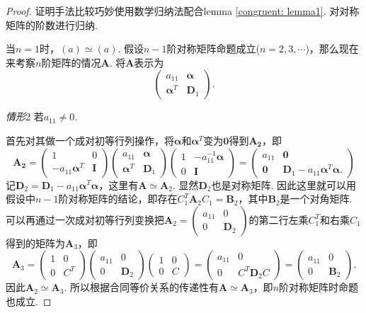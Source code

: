 \documentclass{article}
\newcommand{\mbf}[1]{\bm{#1}}
\begin{document}
\begin{proof}
\rm 证明手法比较巧妙使用数学归纳法配合lemma \ref{congruent: lemma1}. 对对称矩阵的阶数进行归纳.

当$n=1$时，$(a) \simeq (a)$.
假设$n-1$阶对称矩阵命题成立($n=2,3,\cdots$)，那么现在来考察$n$阶矩阵的情况$\mbf{A}$. 将$\mbf{A}$表示为
$$
\begin{pmatrix}
a_{11} & \mbf{\alpha}\\
\mbf{\alpha}^T & \mbf{D}_1
\end{pmatrix}.
$$

\emph{情形}2 若$a_{11} \neq 0$.

首先对其做一个成对初等行列操作，将$\mbf{\alpha}$和$\mbf{\alpha}^T$变为$\mbf{0}$得到$\mbf{A_2}$，即
$$
\mbf{A_2} =
\begin{pmatrix}
1 & 0 \\
-a_{11}\mbf{\alpha}^T & \mbf{I}
\end{pmatrix}
\begin{pmatrix}
a_{11} & \mbf{\alpha}\\
\mbf{\alpha}^T & \mbf{D}_1
\end{pmatrix} 
\begin{pmatrix}
1 & -a_{11}^{-1}\mbf{\alpha} \\
0 & \mbf{I}
\end{pmatrix}
= \begin{pmatrix}
a_{11}  & \mbf{0} \\
\mbf{0} & \mbf{D}_1-a_{11}\mbf{\alpha}^T\mbf{\alpha}.
\end{pmatrix}
$$
记$\mbf{D}_2 =  \mbf{D}_1-a_{11}\mbf{\alpha}^T\mbf{\alpha}$，这里有$\mbf{A} \simeq \mbf{A}_2$. 显然$\mbf{D}_2$也是对称矩阵. 因此这里就可以用假设中$n-1$阶对称矩阵的结论，即存在$C_1^T\mbf{A}_2C_1 = \mbf{B}_2$，其中$\mbf{B}_2$是一个对角矩阵. 可以再通过一次成对初等行列变换把$\mbf{A}_2 = \begin{pmatrix}
a_{11} & 0 \\
0 & \mbf{D}_2
\end{pmatrix}$的第二行左乘$C_1^{T}$和右乘$C_1$得到的矩阵为$\mbf{A}_3$，即
$$
\mbf{A}_3 =
\begin{pmatrix}
1 & 0 \\
0 & C^T 
\end{pmatrix}
\begin{pmatrix}
a_{11} & 0 \\
0 & \mbf{D}_2
\end{pmatrix}
\begin{pmatrix}
1 & 0 \\
0 & C 
\end{pmatrix} =
\begin{pmatrix}
a_{11} & 0 \\
0 & C^T\mbf{D}_2C 
\end{pmatrix} =
\begin{pmatrix}
a_{11} & 0 \\
0 & \mbf{B}_2 
\end{pmatrix}.
$$
因此$\mbf{A}_2 \simeq \mbf{A}_3$. 所以根据合同等价关系的传递性有$\mbf{A} \simeq \mbf{A}_3$，即$n$阶对称矩阵时命题也成立. 


\end{proof}
\end{document}

